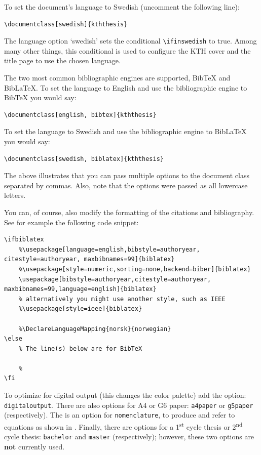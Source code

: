 \documentclass[main.tex]{subfiles}
\begin{document}
To set the document's language to Swedish (uncomment the following line):
\begin{lstlisting}[style=latexExampleForAuthors]
\documentclass[swedish]{kththesis}
\end{lstlisting}

The language option `swedish' sets the conditional \texttt{\textbackslash ifinswedish} to true.  Among many other things, this conditional is used to configure the KTH cover and the title page to use the chosen language.

The two most common bibliographic engines are supported, \ie BibTeX and BibLaTeX. To set the language to English and use the bibliographic engine to BibTeX you would say:
\begin{lstlisting}[style=latexExampleForAuthors]
\documentclass[english, bibtex]{kththesis}
\end{lstlisting}
To set the language to Swedish and use the bibliographic engine to BibLaTeX you would say:
\begin{lstlisting}[style=latexExampleForAuthors]
\documentclass[swedish, biblatex]{kththesis}
\end{lstlisting}

The above illustrates that you can pass multiple options to the document class separated by commas. Also, note that the options were passed as all lowercase letters.

You can, of course, also modify the formatting of the citations and bibliography. See for example the following code snippet:

\begin{lstlisting}[style=latexExampleForAuthors]
\ifbiblatex
    %\usepackage[language=english,bibstyle=authoryear, citestyle=authoryear, maxbibnames=99]{biblatex}
    %\usepackage[style=numeric,sorting=none,backend=biber]{biblatex}
    \usepackage[bibstyle=authoryear,citestyle=authoryear, maxbibnames=99,language=english]{biblatex}
    % alternatively you might use another style, such as IEEE
    %\usepackage[style=ieee]{biblatex}
    
    %\DeclareLanguageMapping{norsk}{norwegian}
\else
    % The line(s) below are for BibTeX
    
    %
\fi
\end{lstlisting}

To optimize for digital output (this changes the color palette) add the option: \texttt{digitaloutput}. There are also options for A4 or G6 paper: \texttt{a4paper} or \texttt{g5paper} (respectively). The is an option for \texttt{nomenclature}, to produce and refer to equations
\ifnomenclature
as shown in 
\fi
.  Finally, there are options for a 1\textsuperscript{st} cycle thesis or 2\textsuperscript{nd} cycle thesis: \texttt{bachelor} and \texttt{master} (respectively); however, these two options are \textbf{not} currently used.
\end{document}
